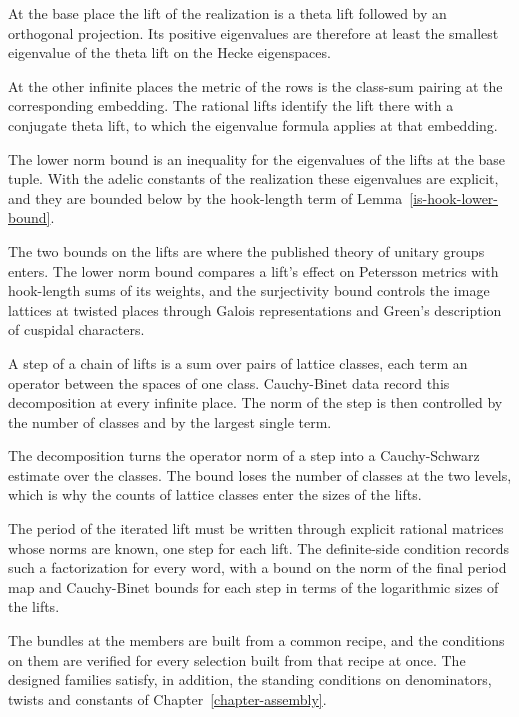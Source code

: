 At the base place the lift of the realization is a theta lift followed by an orthogonal projection.
Its positive eigenvalues are therefore at least the smallest eigenvalue of the theta lift on the Hecke
eigenspaces.

At the other infinite places the metric of the rows is the class-sum pairing at the corresponding
embedding. The rational lifts identify the lift there with a conjugate theta lift, to which the
eigenvalue formula applies at that embedding.

The lower norm bound is an inequality for the eigenvalues of the lifts at the base tuple. With the
adelic constants of the realization these eigenvalues are explicit, and they are bounded below by the
hook-length term of Lemma~\ref{is-hook-lower-bound}.

The two bounds on the lifts are where the published theory of unitary groups enters. The lower norm
bound compares a lift's effect on Petersson metrics with hook-length sums of its weights, and the
surjectivity bound controls the image lattices at twisted places through Galois representations and
Green's description of cuspidal characters.

A step of a chain of lifts is a sum over pairs of lattice classes, each term an operator between
the spaces of one class. Cauchy-Binet data record this decomposition at every infinite place. The
norm of the step is then controlled by the number of classes and by the largest single term.

The decomposition turns the operator norm of a step into a Cauchy-Schwarz estimate over the
classes. The bound loses the number of classes at the two levels, which is why the counts of
lattice classes enter the sizes of the lifts.

The period of the iterated lift must be written through explicit rational matrices whose norms are
known, one step for each lift. The definite-side condition records such a factorization for every
word, with a bound on the norm of the final period map and Cauchy-Binet bounds for each step in
terms of the logarithmic sizes of the lifts.

The bundles at the members are built from a common recipe, and the conditions on them are verified
for every selection built from that recipe at once. The designed families satisfy, in addition, the
standing conditions on denominators, twists and constants of Chapter~\ref{chapter-assembly}.

